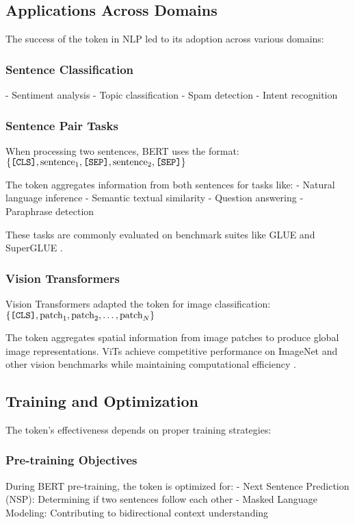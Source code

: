 \subsection{Applications Across Domains}

The success of the \cls{} token in NLP led to its adoption across various domains:

\subsubsection{Sentence Classification}
- Sentiment analysis
- Topic classification  
- Spam detection
- Intent recognition

\subsubsection{Sentence Pair Tasks}
When processing two sentences, BERT uses the format:
$\{\texttt{[CLS]}{}, \text{sentence}_1, \texttt{[SEP]}{}, \text{sentence}_2, \texttt{[SEP]}{}\}$

The \cls{} token aggregates information from both sentences for tasks like:
- Natural language inference
- Semantic textual similarity  
- Question answering
- Paraphrase detection

These tasks are commonly evaluated on benchmark suites like GLUE \citep{wang2018glue} and SuperGLUE \citep{wang2019superglue}.

\subsubsection{Vision Transformers}
Vision Transformers \citep{dosovitskiy2020image} adapted the \cls{} token for image classification:
$\{\texttt{[CLS]}{}, \text{patch}_1, \text{patch}_2, \ldots, \text{patch}_N\}$

The \cls{} token aggregates spatial information from image patches to produce global image representations. ViTs achieve competitive performance on ImageNet \citep{russakovsky2015imagenet, deng2009imagenet} and other vision benchmarks while maintaining computational efficiency \citep{strubell2019energy}.

\subsection{Training and Optimization}

The \cls{} token's effectiveness depends on proper training strategies:

\subsubsection{Pre-training Objectives}
During BERT pre-training, the \cls{} token is optimized for:
- Next Sentence Prediction (NSP): Determining if two sentences follow each other
- Masked Language Modeling: Contributing to bidirectional context understanding

